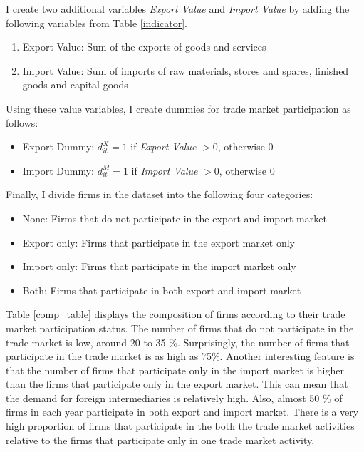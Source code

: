 \documentclass[12pt]{article}
\begin{document}
I create two additional variables \textit{Export Value} and
\textit{Import Value}
by adding the following variables from Table \ref{indicator}.  
\begin{enumerate}
\item Export Value: Sum of the exports of goods and services 
\item Import Value: Sum of imports of raw materials, stores and spares,
  finished goods and capital goods 
\end{enumerate}
Using these value variables, I create dummies for trade market
participation as follows:
\begin{itemize}
\item Export Dummy: $d_{it}^{X}=1$ if \textit{Export Value} $> 0$,
  otherwise $0$
\item Import Dummy: $d_{it}^{M}=1$ if \textit{Import Value} $> 0$, otherwise $0$
\end{itemize} 

Finally, I divide firms in the dataset into the following four categories:
\begin{itemize}
\item None: Firms that do not participate in the export and import
  market 
\item Export only: Firms that participate in the export market only
\item Import only: Firms that participate in the import market only
\item Both: Firms that participate in both export and import market
\end{itemize}

Table \ref{comp_table} displays the composition of firms according to their trade market
participation status. The number of firms that do not
participate in the trade market is low, around 20 to 35
\%. Surprisingly, the number of firms that participate in the trade
market is as high as 75\%. Another interesting feature is that the number
of firms that participate only in the import market is higher than the
firms that participate only in the export market. This can mean that
the demand for foreign intermediaries is relatively high. Also, almost 50 \% of
firms in each year participate in both export and import market. There is
a very high proportion of firms that participate in the both the trade market activities relative to the firms that
participate only in one trade market activity. 
\end{document}
